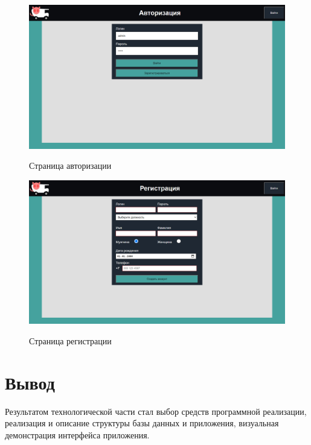 \begin{figure}[h!] 
	\begin{center}
		{\includegraphics[scale=0.38, angle=0]{sc/login}}
		\caption{Страница авторизации}
		\label{login_sc}
	\end{center}
\end{figure}

\begin{figure}[h!] 
	\begin{center}
		{\includegraphics[scale=0.38, angle=0]{sc/signup}}
		\caption{Страница регистрации}
		\label{signup_sc}
	\end{center}
\end{figure}


\section*{Вывод}
Результатом технологической части стал выбор средств программной реализации, реализация и описание структуры базы данных и приложения, визуальная демонстрация интерфейса приложения.
